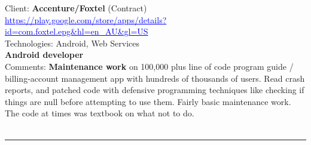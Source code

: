 \documentclass{article}
\begin{document}
%
%

Client: 	\textbf  {Accenture/Foxtel} (Contract) \\
\textcolor{blue}{ \underline{https://play.google.com/store/apps/details?id=com.foxtel.epg\&hl=en\_AU\&gl=US } }  \\
Technologies: 	Android, Web Services \\
\textbf{ 		Android developer  } \\
Comments:	{\bf Maintenance work} on 100,000 plus line of code program guide / billing-account management app with hundreds of thousands of users. Read crash reports, and patched code with defensive programming techniques like checking if things are null before attempting to use them. Fairly basic maintenance work. The code at times was textbook on what not to do. \\
\\

\noindent\hfil\rule{0.5\textwidth}{.4pt}\hfil
\\

\end{document}
